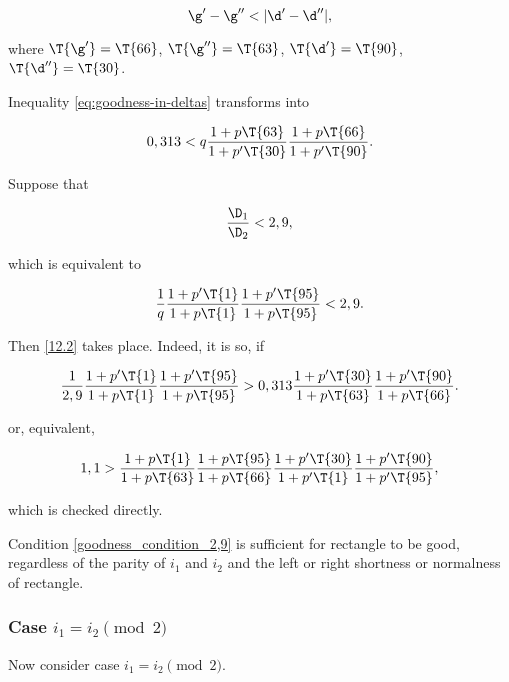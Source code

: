 \begin{equation}\label{eq:goodness-in-deltas}
	\g' - \g'' < |\d' - \d''|,
\end{equation}

where
$\T{\g'} = \T{66}$,
$\T{\g''} = \T{63}$,
$\T{\d'} = \T{90}$,
$\T{\d''} = \T{30}$.

Inequality \ref{eq:goodness-in-deltas} transforms into

\begin{equation}\label{12.2}
	0,313 <
	q
	\dfrac{1 + p \T{63}}{1 + p' \T{30}}
	\dfrac{1 + p \T{66}}{1 + p' \T{90}}.
\end{equation}

Suppose that

\begin{equation}\label{goodness_condition_2,9}
	\dfrac{\D_1}{\D_2} < 2,9,
\end{equation}

which is equivalent to

\begin{equation}
	\dfrac{1}{q}
	\dfrac{1 + p' \T{1}}{1 + p \T{1}}
	\dfrac{1 + p' \T{95}}{1 + p \T{95}}
	<
	2,9.
\end{equation}

Then \ref{12.2} takes place. Indeed, it is so, if

\begin{equation*}
	\dfrac{1}{2,9}
	\dfrac{1 + p' \T{1}}{1 + p \T{1}}
	\dfrac{1 + p' \T{95}}{1 + p \T{95}}
	>
	0,313
	\dfrac{1 + p' \T{30}}{1 + p \T{63}}
	\dfrac{1 + p' \T{90}}{1 + p \T{66}}.
\end{equation*}

or, equivalent,

\begin{equation*}
	1,1
	>
	\dfrac{1 + p \T{1}}{1 + p \T{63}}
	\dfrac{1 + p \T{95}}{1 + p \T{66}}
	\dfrac{1 + p' \T{30}}{1 + p' \T{1}}
	\dfrac{1 + p' \T{90}}{1 + p' \T{95}},
\end{equation*}

which is checked directly.

Condition \ref{goodness_condition_2,9} is sufficient for rectangle to be good,
regardless of the parity of $i_1$ and $i_2$ and the left or right shortness or normalness of rectangle.

\subsubsection{Case $i_1 = i_2 \pmod 2$}

Now consider case $i_1 = i_2 \pmod 2$.


